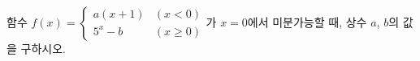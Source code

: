 함수 $f(x)=\begin{cases} a(x+1) & (x<0) \\ 5^x-b & (x\ge 0) \end{cases}$가 $x=0$에서 미분가능할 때, 상수 $a$, $b$의 값을 구하시오.
